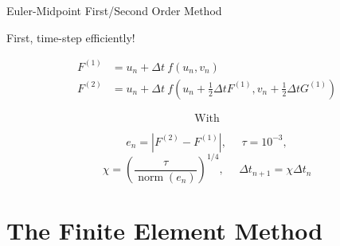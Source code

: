 \documentclass{beamer}
\begin{document}
            

        
        \begin{frame}{Euler-Midpoint First/Second Order Method}
            
            First, time-step efficiently!
            
            \begin{align*}
                F^{(1)}&=u_{n}+\Delta t~ f\left(u_{n}, v_{n}\right)\\
                F^{(2)}&=u_{n}+\Delta t~ f\left(u_{n}+\frac{1}{2} \Delta t F^{(1)}, v_{n}+\frac{1}{2} \Delta t G^{(1)}\right) 
            \end{align*}
            \vfill
            
            $$\text{With}$$
            
            \vfill
            
            $$e_{n}=\left|F^{(2)}-F^{(1)}\right|, ~~~~~~ \tau = 10^{-3},$$
            $$\chi=\left(\frac{\tau}{\operatorname{norm}\left(e_{n}\right)}\right)^{1/4}, ~~~~~~ \Delta t_{n+1} = \chi\Delta t_n$$
            
            \vfill
            
        \end{frame}
    
    
        \section[Linear System]{The Finite Element Method}    
        
\end{document}
